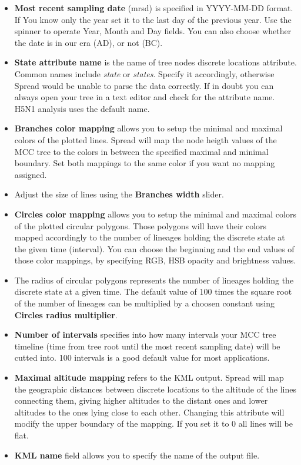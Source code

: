 \begin{itemize}
\item \textbf{Most recent sampling date} (mrsd) is specified in YYYY-MM-DD
format. If You know only the year set it to the last day of the previous
year. Use the spinner to operate Year, Month and Day fields. You can
also choose whether the date is in our era (AD), or not (BC).
\item \textbf{State attribute name} is the name of tree nodes discrete locations
attribute. Common names include \textsl{state} or \textsl{states}.
Specify it accordingly, otherwise Spread would be unable to parse
the data correctly. If in doubt you can always open your tree in a
text editor and check for the attribute name. H5N1 analysis uses the
default name. 
\item \textbf{Branches color mapping} allows you to setup the minimal and
maximal colors of the plotted lines. Spread will map the node heigth
values of the MCC tree to the colors in between the specified maximal
and minimal boundary. Set both mappings to the same color if you want
no mapping assigned.
\item Adjust the size of lines using the \textbf{Branches width} slider.
\item \textbf{Circles color mapping} allows you to setup the minimal and
maximal colors of the plotted circular polygons. Those polygons will
have their colors mapped accordingly to the number of lineages holding
the discrete state at the given time (interval). You can choose the
beginning and the end values of those color mappings, by specifying
RGB, HSB opacity and brightness values.
\item The radius of circular polygons represents the number of lineages
holding the discrete state at a given time. The default value of 100
times the square root of the number of lineages can be multiplied
by a choosen constant using \textbf{Circles radius multiplier}.
\item \textbf{Number of intervals} specifies into how many intervals your
MCC tree timeline (time from tree root until the most recent sampling
date) will be cutted into. 100 intervals is a good default value for
most applications.
\item \textbf{Maximal altitude mapping} refers to the KML output. Spread
will map the geographic distances between discrete locations to the
altitude of the lines connecting them, giving higher altitudes to
the distant ones and lower altitudes to the ones lying close to each
other. Changing this attribute will modify the upper boundary of the
mapping. If you set it to 0 all lines will be flat.
\item \textbf{KML name} field allows you to specify the name of the output
file.
\end{itemize}


